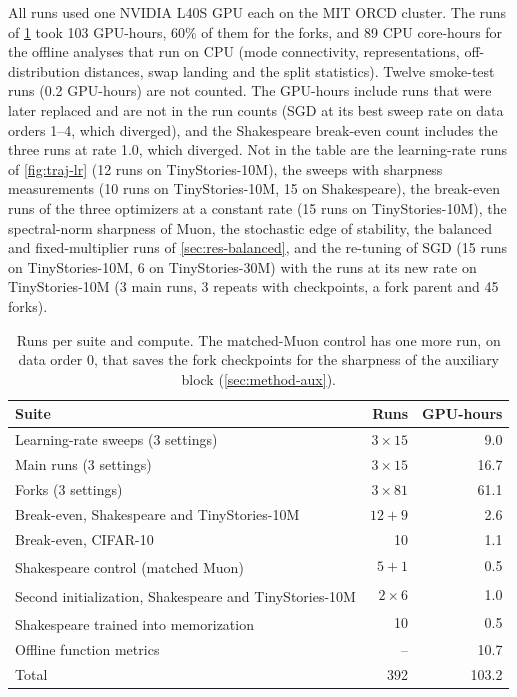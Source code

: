 \documentclass[10pt]{article}
\newcommand{\extra}{\textsuperscript{\dag}}  %
\begin{document}
All runs used one NVIDIA L40S GPU each on the MIT ORCD cluster. The runs of \cref{tab:compute} took 103
GPU-hours, 60\% of them for the forks, and 89 CPU core-hours for the offline analyses that run on CPU (mode
connectivity, representations, off-distribution distances, swap landing and the split statistics). Twelve smoke-test runs (0.2 GPU-hours) are
not counted. The GPU-hours include runs that were later replaced and are not in the run counts (SGD at its best
sweep rate on data orders 1--4, which diverged), and the Shakespeare break-even count includes the three runs at
rate 1.0, which diverged. Not in the table are the learning-rate runs of \cref{fig:traj-lr} (12 runs on
TinyStories-10M), the sweeps with sharpness measurements (10 runs on TinyStories-10M, 15 on Shakespeare), the
break-even runs of the three optimizers at a constant rate (15 runs on TinyStories-10M), the spectral-norm sharpness
of Muon, the stochastic edge of stability, the balanced and fixed-multiplier runs of \cref{sec:res-balanced}, and
the re-tuning of SGD (15 runs on TinyStories-10M, 6 on TinyStories-30M) with the runs at its new rate on
TinyStories-10M (3 main runs, 3 repeats with checkpoints, a fork parent and 45 forks).

\begin{table}[ht]
\centering\small
\caption{Runs per suite and compute. The matched-Muon control has one more run, on data order 0, that saves the
fork checkpoints for the sharpness of the auxiliary block (\cref{sec:method-aux}).}
\label{tab:compute}
\begin{tabular}{@{}lrr@{}}
\toprule
Suite & Runs & GPU-hours \\
\midrule
Learning-rate sweeps (3 settings) & $3\times15$ & 9.0 \\
Main runs (3 settings) & $3\times15$ & 16.7 \\
Forks (3 settings) & $3\times81$ & 61.1 \\
Break-even, Shakespeare and TinyStories-10M & $12+9$ & 2.6 \\
Break-even, CIFAR-10 & 10 & 1.1 \\
Shakespeare control (matched Muon)\extra & $5+1$ & 0.5 \\
Second initialization, Shakespeare and TinyStories-10M\extra & $2\times6$ & 1.0 \\
Shakespeare trained into memorization\extra & 10 & 0.5 \\
Offline function metrics & -- & 10.7 \\
\midrule
Total & 392 & 103.2 \\
\bottomrule
\end{tabular}
\end{table}
\end{document}
